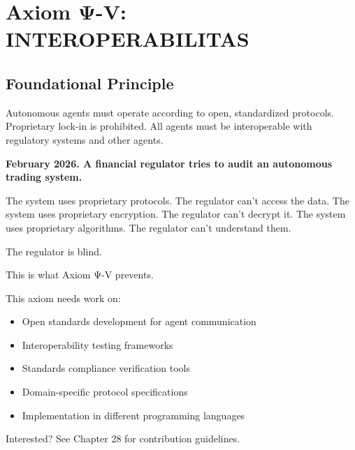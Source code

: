 
\chapter{Axiom Ψ-V: INTEROPERABILITAS}
\label{ch:axiom-V}

\section*{Foundational Principle}

\begin{principlebox}
Autonomous agents must operate according to open, standardized protocols. Proprietary lock-in is prohibited. All agents must be interoperable with regulatory systems and other agents.
\end{principlebox}

\vspace{0.5cm}

\begin{tcolorbox}[colback=lightgray, colframe=legislativeblue, title=\textbf{📖 Why This Axiom Matters}]
\textbf{February 2026. A financial regulator tries to audit an autonomous trading system.}

The system uses proprietary protocols. The regulator can't access the data. The system uses proprietary encryption. The regulator can't decrypt it. The system uses proprietary algorithms. The regulator can't understand them.

The regulator is blind.

This is what Axiom Ψ-V prevents.
\end{tcolorbox}

\vspace{0.5cm}

\begin{tcolorbox}[colback=lightgray, colframe=accentgold, title=\textbf{🎯 Contribution Opportunity}]
This axiom needs work on:
\begin{itemize}
    \item Open standards development for agent communication
    \item Interoperability testing frameworks
    \item Standards compliance verification tools
    \item Domain-specific protocol specifications
    \item Implementation in different programming languages
\end{itemize}

Interested? See Chapter 28 for contribution guidelines.
\end{tcolorbox}

